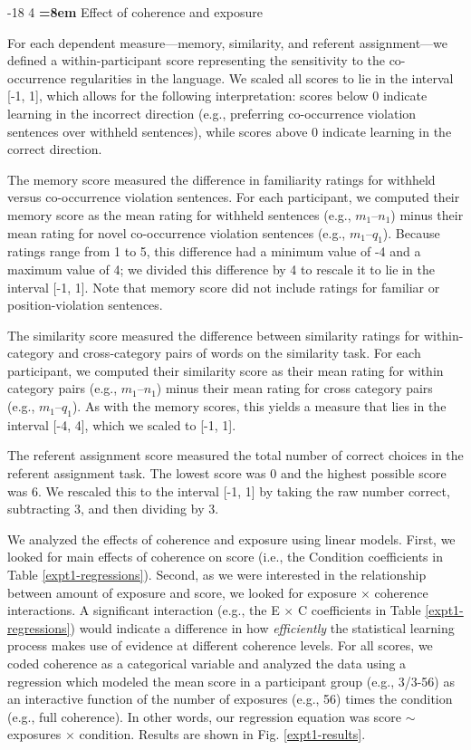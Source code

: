 \documentclass[man,longtable,floatsintext]{my-apa6}
\makeatletter
\renewcommand\subsubsection{\@startsection{subsubsection}{3}{\z@}%
                       {-18\p@ \@plus -4\p@ \@minus -4\p@}%
                       {4\p@ \@plus 2\p@ \@minus 2\p@}%
                       {\normalfont\normalsize\bfseries\boldmath
                        \rightskip=\z@ \@plus 8em\pretolerance=10000 }}
\makeatother
\begin{document}
\subsubsection{Effect of coherence and exposure}

For each dependent measure---memory, similarity, and referent assignment---we defined a within-participant score representing the sensitivity to the co-occurrence regularities in the language. We scaled all scores to lie in the interval [-1, 1], which allows for the following interpretation: scores below 0 indicate learning in the incorrect direction (e.g., preferring co-occurrence violation sentences over withheld sentences), while scores above 0 indicate learning in the correct direction.

The memory score measured the difference in familiarity ratings for withheld versus co-occurrence violation sentences. For each participant, we computed their memory score as the mean rating for withheld sentences (e.g., $m_1$--$n_1$) minus their mean rating for novel co-occurrence violation sentences (e.g., $m_1$--$q_1$). Because ratings range from 1 to 5, this difference had a minimum value of -4 and a maximum value of 4; we divided this difference by 4 to rescale it to lie in the interval [-1, 1]. Note that memory score did not include ratings for familiar or position-violation sentences.

The similarity score measured the difference between similarity ratings for within-category and cross-category pairs of words on the similarity task. For each participant, we computed their similarity score as their mean rating for within category pairs (e.g., $m_1$--$n_1$) minus their mean rating for cross category pairs (e.g., $m_1$--$q_1$). As with the memory scores, this yields a measure that lies in the interval [-4, 4], which we scaled to [-1, 1].

The referent assignment score measured the total number of correct choices in the referent assignment task. The lowest score was 0 and the highest possible score was 6. We rescaled this to the interval [-1, 1] by taking the raw number correct, subtracting 3, and then dividing by 3.

We analyzed the effects of coherence and exposure using linear models. First, we looked for main effects of coherence on score (i.e., the Condition coefficients in Table \ref{expt1-regressions}). Second, as we were interested in the relationship between amount of exposure and score, we looked for exposure $\times$ coherence interactions. A significant interaction (e.g., the E $\times$ C coefficients in Table \ref{expt1-regressions}) would indicate a difference in how \emph{efficiently} the statistical learning process makes use of evidence at different coherence levels. For all scores, we coded coherence as a categorical variable and analyzed the data using a regression which modeled the mean score in a participant group (e.g., 3/3-56) as an interactive function of the number of exposures (e.g., 56) times the condition (e.g., full coherence). In other words, our regression equation was score $\sim$ exposures $\times$ condition. Results are shown in Fig. \ref{expt1-results}.
\end{document}
